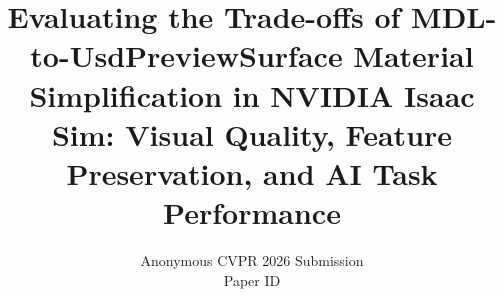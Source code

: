 \documentclass[10pt,twocolumn,letterpaper]{article}
\title{Evaluating the Trade-offs of MDL-to-UsdPreviewSurface Material
Simplification in NVIDIA Isaac Sim: Visual Quality, Feature Preservation,
and AI Task Performance}
\author{Anonymous CVPR 2026 Submission\\
Paper ID \cvprPaperID}
\begin{document}
\maketitle









{\small


}
\end{document}
